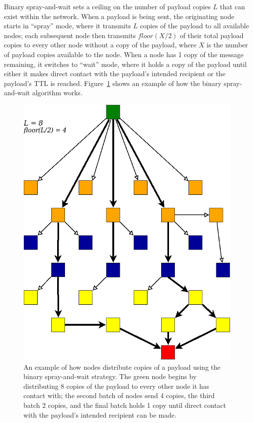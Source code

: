\documentclass[12pt]{article}
\begin{document}
    Binary spray-and-wait sets a ceiling on the number of payload copies \(L\) that can exist within the network. When a payload is being sent, the originating node starts in ``spray'' mode, where it transmits \(L\) copies of the payload to all available nodes; each subsequent node then transmits \(floor(X/2)\) of their total payload copies to every other node without a copy of the payload, where \(X\) is the number of payload copies available to the node. When a node has 1 copy of the message remaining, it switches to ``wait'' mode, where it holds a copy of the payload until either it makes direct contact with the payload's intended recipient or the payload's TTL is reached. Figure~\ref{fig:spraywait} shows an example of how the binary spray-and-wait algorithm works.
    
    \begin{figure}[h]
      \centering{}
      \includegraphics[scale=0.45]{Diagram2.png}
      \caption{An example of how nodes distribute copies of a payload using the binary spray-and-wait strategy. The green node begins by distributing 8 copies of the payload to every other node it has contact with; the second batch of nodes send 4 copies, the third batch 2 copies, and the final batch holds 1 copy until direct contact with the payload's intended recipient can be made.}
      \label{fig:spraywait}
    \end{figure}
    
\end{document}

